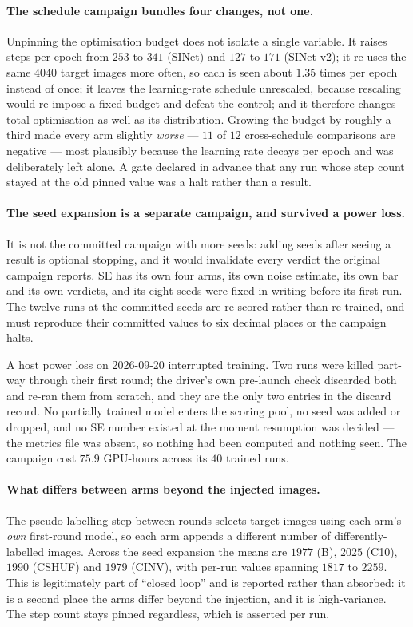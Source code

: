 \documentclass{article} %
\begin{document}
\paragraph{The schedule campaign bundles four changes, not one.} Unpinning the optimisation budget
does not isolate a single variable. It raises steps per epoch from $253$ to $341$ (SINet) and $127$
to $171$ (SINet-v2); it re-uses the same $4040$ target images more often, so each is seen about
$1.35$ times per epoch instead of once; it leaves the learning-rate schedule unrescaled, because
rescaling would re-impose a fixed budget and defeat the control; and it therefore changes total
optimisation as well as its distribution. Growing the budget by roughly a third made every arm
slightly \emph{worse} --- $11$ of $12$ cross-schedule comparisons are negative --- most plausibly
because the learning rate decays per epoch and was deliberately left alone. A gate declared in
advance that any run whose step count stayed at the old pinned value was a halt rather than a
result.

\paragraph{The seed expansion is a separate campaign, and survived a power loss.} It is not the
committed campaign with more seeds: adding seeds after seeing a result is optional stopping, and it
would invalidate every verdict the original campaign reports. SE has its own four arms, its own
noise estimate, its own bar and its own verdicts, and its eight seeds were fixed in writing before
its first run. The twelve runs at the committed seeds are re-scored rather than re-trained, and must
reproduce their committed values to six decimal places or the campaign halts.

A host power loss on 2026-09-20 interrupted training. Two runs were killed part-way through their
first round; the driver's own pre-launch check discarded both and re-ran them from scratch, and they
are the only two entries in the discard record. No partially trained model enters the scoring pool,
no seed was added or dropped, and no SE number existed at the moment resumption was decided --- the
metrics file was absent, so nothing had been computed and nothing seen. The campaign cost $75.9$
GPU-hours across its $40$ trained runs.

\paragraph{What differs between arms beyond the injected images.} The pseudo-labelling step between
rounds selects target images using each arm's \emph{own} first-round model, so each arm appends a
different number of differently-labelled images. Across the seed expansion the means are $1977$ (B),
$2025$ (C10), $1990$ (CSHUF) and $1979$ (CINV), with per-run values spanning $1817$ to $2259$. This
is legitimately part of ``closed loop'' and is reported rather than absorbed: it is a second place
the arms differ beyond the injection, and it is high-variance. The step count stays pinned
regardless, which is asserted per run.
\end{document}
